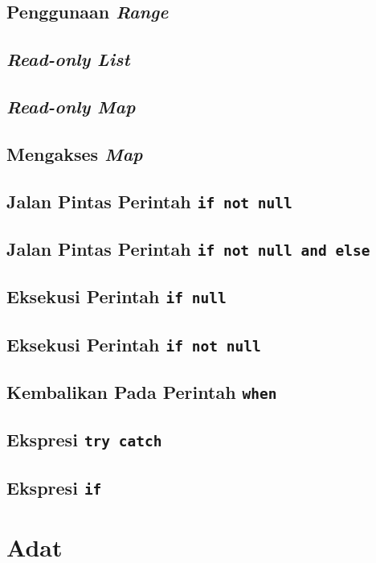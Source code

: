 \subsection{Penggunaan \textit{Range}}
\subsection{\textit{Read-only List}}
\subsection{\textit{Read-only Map}}
\subsection{Mengakses \textit{Map}}
\subsection{Jalan Pintas Perintah \texttt{if not null}}
\subsection{Jalan Pintas Perintah \texttt{if not null and else}}
\subsection{Eksekusi Perintah \texttt{if null}}
\subsection{Eksekusi Perintah \texttt{if not null}}
\subsection{Kembalikan Pada Perintah \texttt{when}}
\subsection{Ekspresi \texttt{try catch}}
\subsection{Ekspresi \texttt{if}}

\section{Adat}